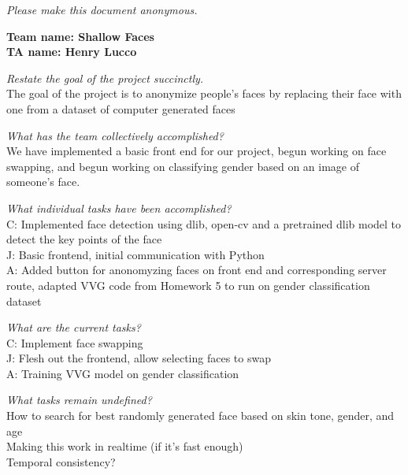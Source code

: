 \emph{Please make this document anonymous.}

\textbf{Team name: Shallow Faces}\\
\textbf{TA name: Henry Lucco}




%
\textit{Restate the goal of the project succinctly.}\\
The goal of the project is to anonymize people's faces by replacing their face with one from a dataset of computer generated faces

\textit{What has the team collectively accomplished?}\\
We have implemented a basic front end for our project, begun working on face swapping, and begun working on classifying gender based on an image of someone's face.

\textit{What individual tasks have been accomplished?}\\
C: Implemented face detection using dlib, open-cv and a pretrained dlib model to detect the key points of the face\\
J: Basic frontend, initial communication with Python\\
A: Added button for anonomyzing faces on front end and corresponding server route, adapted VVG code from Homework 5 to run on gender classification dataset

\textit{What are the current tasks?}\\
C: Implement face swapping\\
J: Flesh out the frontend, allow selecting faces to swap\\
A: Training VVG model on gender classification

\textit{What tasks remain undefined?}\\
How to search for best randomly generated face based on skin tone, gender, and age\\
Making this work in realtime (if it's fast enough)\\
Temporal consistency?

